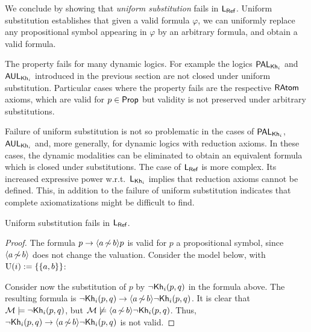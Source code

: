 We conclude by showing that \emph{uniform substitution} fails in $\mathsf{L_{Ref}}$. Uniform substitution establishes that given a valid formula $\varphi$, we can uniformly replace any propositional symbol appearing in $\varphi$ by an arbitrary formula, and obtain a valid formula.  
\begin{mrevised}
The property fails for many dynamic logics.  For example the logics $\mathsf{PAL}_{{\sf Kh}_i}$ and $\mathsf{AUL}_{{\sf Kh}_i}$ introduced in the previous section are not closed under uniform substitution.  Particular cases where the property fails are the respective $\textsf{RAtom}$ axioms, which are valid for $p \in {\rm \sf Prop}$ but validity is not preserved under arbitrary substitutions. 

Failure of uniform substitution is not so problematic in the cases of $\mathsf{PAL}_{{\sf Kh}_i}$, $\mathsf{AUL}_{{\sf Kh}_i}$ and, more generally, for dynamic logics with 
reduction axioms. In these cases, the dynamic modalities can be eliminated to obtain an equivalent formula which is closed under substitutions. The case of $\mathsf{L_{Ref}}$ is more complex. Its increased expressive power w.r.t.\ $\mathsf{L}_{{\sf Kh}_i}$ implies that reduction axioms cannot be defined.  This, in addition to the failure of uniform substitution indicates that complete axiomatizations might be difficult to find. 
\end{mrevised}

\medskip

\begin{proposition}\label{prop:substitution-ref}
    Uniform substitution fails in $\mathsf{L_{Ref}}$.
\end{proposition}

\begin{proof}
The formula $p\to\langle a{\,\not\sim\,}b \rangle p$ is valid for $p$ a propositional symbol, since $\langle a{\,\not\sim\,}b \rangle$ does not change the valuation. Consider the model below, with $\operatorname{U}(i):=\{ \{ a,b \} \}$:
\begin{center}
\end{center}
Consider now the substitution of $p$ by $\neg{\sf Kh}_i(p,q)$ in the formula above. The resulting formula is $\neg{\sf Kh}_i(p,q)\to\langle a{\,\not\sim\,}b \rangle\neg{\sf Kh}_i(p,q)$. It is clear that $\mathcal{M}\models\neg{\sf Kh}_i(p,q)$, but $\mathcal{M}\not\models\langle a{\,\not\sim\,}b \rangle\neg{\sf Kh}_i(p,q)$. Thus, $\neg{\sf Kh}_i(p,q)\to\langle a{\,\not\sim\,}b \rangle\neg{\sf Kh}_i(p,q)$ is not valid.
\end{proof}

